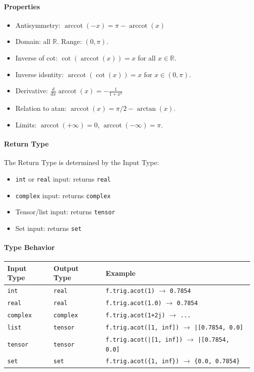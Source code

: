 \paragraph{Properties}
\begin{itemize}
\item Antisymmetry: $\operatorname{arccot}(-x) = \pi - \operatorname{arccot}(x)$
\item Domain: all $\mathbb{R}$. Range: $(0, \pi)$.
\item Inverse of cot: $\cot(\operatorname{arccot}(x)) = x$ for all $x \in \mathbb{R}$.
\item Inverse identity: $\operatorname{arccot}(\cot(x)) = x$ for $x \in (0, \pi)$.
\item Derivative: $\frac{d}{dx}\operatorname{arccot}(x) = -\frac{1}{1 + x^2}$
\item Relation to atan: $\operatorname{arccot}(x) = \pi/2 - \arctan(x)$.
\item Limits: $\operatorname{arccot}(+\infty) = 0$, $\operatorname{arccot}(-\infty) = \pi$.
\end{itemize}

\paragraph{Return Type}
The Return Type is determined by the Input Type:
\begin{itemize}
\item \texttt{int} or \texttt{real} input: returns \texttt{real}
\item \texttt{complex} input: returns \texttt{complex}
\item Tensor/list input: returns \texttt{tensor}
\item Set input: returns \texttt{set}
\end{itemize}

\paragraph{Type Behavior}
\begin{center}
\begin{tabular}{lll}
\textbf{Input Type} & \textbf{Output Type} & \textbf{Example} \\ \hline
\texttt{int} & \texttt{real} & \texttt{f.trig.acot(1)} $\to$ \texttt{0.7854} \\
\texttt{real} & \texttt{real} & \texttt{f.trig.acot(1.0)} $\to$ \texttt{0.7854} \\
\texttt{complex} & \texttt{complex} & \texttt{f.trig.acot(1+2j)} $\to$ \texttt{...} \\
\texttt{list} & \texttt{tensor} & \texttt{f.trig.acot([1, inf])} $\to$ \texttt{|[0.7854, 0.0]} \\
\texttt{tensor} & \texttt{tensor} & \texttt{f.trig.acot(|[1, inf])} $\to$ \texttt{|[0.7854, 0.0]} \\
\texttt{set} & \texttt{set} & \texttt{f.trig.acot(\{1, inf\})} $\to$ \texttt{\{0.0, 0.7854\}} \\
\end{tabular}
\end{center}

